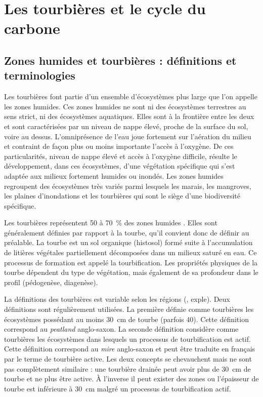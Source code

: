 \section{Les tourbières et le cycle du carbone}

\subsection{Zones humides et tourbières : définitions et terminologies}
Les tourbières font partie d'un ensemble d'écosystèmes plus large que l'on appelle les zones humides.
Ces zones humides ne sont ni des écosystèmes terrestres au sens strict, ni des écosystèmes aquatiques.
Elles sont à la frontière entre les deux et sont caractérisées par un niveau de nappe élevé, proche de la surface du sol, voire au dessus.
L'omniprésence de l'eau joue fortement sur l'aération du milieu et contraint de façon plus ou moins importante l'accès à l'oxygène.
De ces particularités, niveau de nappe élevé et accès à l'oxygène difficile, résulte le développement, dans ces écosystèmes, d'une végétation spécifique qui s'est adaptée aux milieux fortement humides ou inondés.
Les zones humides regroupent des écosystèmes très variés parmi lesquels les marais, les mangroves, les plaines d'inondations et les tourbières qui sont le siège d'une biodiversité spécifique.

Les tourbières représentent 50 à \SI{70}{\percent} des zones humides \cite{joosten2002}.
Elles sont généralement définies par rapport à la tourbe, qu'il convient donc de définir au préalable.
La tourbe est un sol organique (histosol) formé suite à l'accumulation de litières végétales partiellement décomposées dans un milieux saturé en eau.
Ce processus de formation est appelé la tourbification.
Les propriétés physiques de la tourbe dépendent du type de végétation, mais également de sa profondeur dans le profil (pédogenèse, diagenèse).

La définitions des tourbières est variable selon les régions (\plop, exple).
Deux définitions sont régulièrement utilisées.
La première définie comme tourbières les écosystèmes possédant au moins \SI{30}{\cm} de tourbe (parfois 40).
Cette définition correspond au \textit{peatland} anglo-saxon.
La seconde définition considère comme tourbières les écosystèmes dans lesquels un processus de tourbification est actif.
Cette définition correspond au \textit{mire} anglo-saxon et peut être traduite en français par le terme de tourbière active.
Les deux concepts se chevauchent mais ne sont pas complètement similaire : une tourbière drainée peut avoir plus de \SI{30}{cm} de tourbe et ne plus être active.
À l'inverse il peut exister des zones ou l'épaisseur de tourbe est inférieure à \SI{30}{cm} malgré un processus de tourbification actif.

